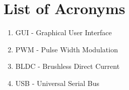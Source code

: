 \section{List of Acronyms}
\begin{enumerate}
	\item GUI - Graphical User Interface
	\item PWM - Pulse Width Modulation
	\item BLDC - Brushless Direct Current
	\item USB - Universal Serial Bus
\end{enumerate}

